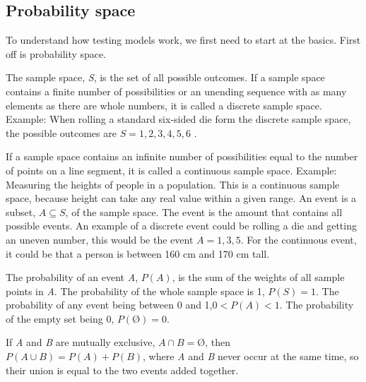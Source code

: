\subsection{Probability space}
To understand how testing models work, we first need to start at the basics. First off is probability space. 

The sample space, \textit{S}, is the set of all possible outcomes.
\newline
If a sample space contains a finite number of possibilities or an unending sequence with as many elements as there are whole numbers, it is called a discrete sample space.
\newline
Example: When rolling a standard six-sided die form the discrete sample space, the possible outcomes are $S={1,2,3,4,5,6}$ .
\newline

\noindent If a sample space contains an infinite number of possibilities equal to the number of points on a line segment, it is called a continuous sample space.
\break
Example: Measuring the heights of people in a population. This is a continuous sample space, because height can take any real value within a given range. 
\newline
An event is a subset, $A\subseteq S$, of the sample space. The event is the amount that contains all possible events.
An example of a discrete event could be rolling a die and getting an uneven number, this would be the event $A={1,3,5}$.
\newline 
For the continuous event, it could be that a person is between 160 cm and 170 cm tall.
\newline

\noindent The probability of an event \textit{A}, $P(A)$, is the sum of the weights of all sample points in \textit{A}.
The probability of the whole sample space is 1, $P(S)=1$.
The probability of any event being between 0 and 1,$0<P(A)<1$.
The probability of the empty set being 0, $P(Ø)=0$.
\newline
\newline

\noindent If \textit{A} and \textit{B} are mutually exclusive, $A \cap B=Ø$, then
\newline
$P(A \cup B) = P(A)+P(B)$,
\newline
\newline
where \textit{A} and \textit{B} never occur at the same time, so their union is equal to the two events added together. 
\newline

